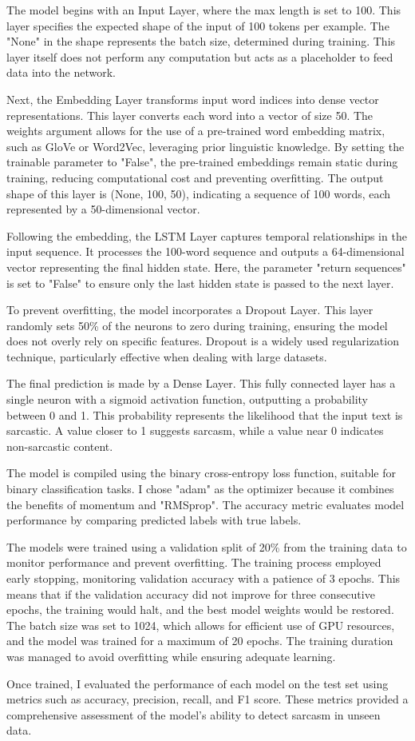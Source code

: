 The model begins with an Input Layer, where the max length is set to 100. This layer specifies the expected shape of the input of 100 tokens per example. 
The "None" in the shape represents the batch size, determined during training. This layer itself does not perform any computation but acts as a placeholder to feed data into the network.

Next, the Embedding Layer transforms input word indices into dense vector representations. This layer converts each word into a vector of size 50. The weights argument allows for the 
use of a pre-trained word embedding matrix, such as GloVe or Word2Vec, leveraging prior linguistic knowledge. By setting the trainable parameter to "False", the pre-trained embeddings 
remain static during training, reducing computational cost and preventing overfitting. The output shape of this layer is (None, 100, 50), indicating a sequence of 100 words, each 
represented by a 50-dimensional vector.

Following the embedding, the LSTM Layer captures temporal relationships in the input sequence. It processes the 100-word sequence and outputs a 64-dimensional vector representing the 
final hidden state. Here, the parameter "return sequences" is set to "False" to ensure only the last hidden state is passed to the next layer.

To prevent overfitting, the model incorporates a Dropout Layer. This layer randomly sets 50{\%} of the neurons to zero during training, ensuring the model does not overly rely on 
specific features. Dropout is a widely used regularization technique, particularly effective when dealing with large datasets.

The final prediction is made by a Dense Layer. This fully connected layer has a single neuron with a sigmoid activation function, outputting a probability between 0 and 1. 
This probability represents the likelihood that the input text is sarcastic. A value closer to 1 suggests sarcasm, while a value near 0 indicates non-sarcastic content.

The model is compiled using the binary cross-entropy loss function, suitable for binary classification tasks. I chose "adam" as the optimizer because it combines the benefits of momentum
and "RMSprop". The accuracy metric evaluates model performance by comparing predicted labels with true labels.

The models were trained using a validation split of 20\% from the training data to monitor performance and prevent overfitting. The training process employed early stopping, monitoring 
validation accuracy with a patience of 3 epochs. This means that if the validation accuracy did not improve for three consecutive epochs, the training would halt, and the best model 
weights would be restored. The batch size was set to 1024, which allows for efficient use of GPU resources, and the model was trained for a maximum of 20 epochs. The training duration
was managed to avoid overfitting while ensuring adequate learning.

Once trained, I evaluated the performance of each model on the test set using metrics such as accuracy, precision, recall, and F1 score. These metrics provided a comprehensive assessment
of the model's ability to detect sarcasm in unseen data.